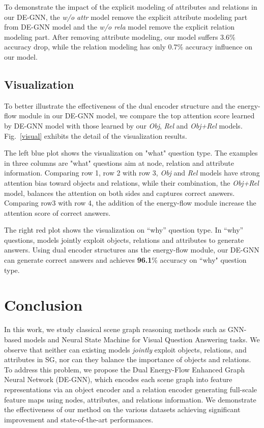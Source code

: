 \documentclass[letterpaper]{article} %
\begin{document}
To demonstrate the impact of the explicit modeling of attributes and relations in our DE-GNN, the \emph{w/o attr} model remove the explicit attribute modeling part from DE-GNN model and the \emph{w/o rela} model remove the explicit relation modeling part. After removing attribute modeling, our model suffers 3.6\% accuracy drop, while the relation modeling has only 0.7\% accuracy influence on our model.



\subsection{Visualization}
To better illustrate the effectiveness of the dual encoder structure and the energy-flow module in our DE-GNN model, we compare the top attention score learned by DE-GNN model with those learned by our \emph{Obj}, \emph{Rel} and \emph{Obj+Rel} models. Fig.~\ref{visual} exhibits the detail of the visualization results.

The left blue plot shows the visualization on "what" question type. The examples in three columns are "what" questions aim at node, relation and attribute information. Comparing row 1, row 2 with row 3, \emph{Obj} and \emph{Rel} models have strong attention bias toward objects and relations, while their combination, the \emph{Obj+Rel} model, balances the attention on both sides and captures correct answers. Comparing row3 with row 4, the addition of the energy-flow module increase the attention score of correct answers. 

The right red plot shows the visualization on ``why'' question type. In ``why'' questions, models jointly exploit objects, relations and attributes to generate answers. Using dual encoder structures ans the energy-flow module, our DE-GNN can generate correct answers and achieves \textbf{96.1}\% accuracy on ``why" question type.

\section{Conclusion}
In this work, we study classical scene graph reasoning methods such as GNN-based models and Neural State Machine for Visual Question Answering tasks. 
We observe that neither can existing models \emph{jointly} exploit objects, relations, and attributes in SG, nor can they balance the importance of objects and relations.
To address this problem, we propose the Dual Energy-Flow Enhanced Graph Neural Network (DE-GNN), which encodes each scene graph into feature representations via an object encoder and a relation encoder generating full-scale feature maps using nodes, attributes, and relations information. 
We demonstrate the effectiveness of our method on the various datasets achieving significant improvement and state-of-the-art performances.
\end{document}
